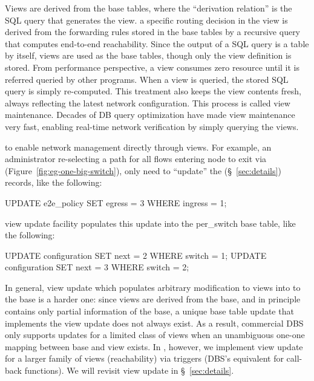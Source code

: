  Views are derived from the base
tables, where the ``derivation relation'' is the SQL query that
generates the view. \Eg a specific routing decision in the
 view is derived from the forwarding rules
stored in the base tables by a recursive query that computes
end-to-end reachability. Since the output of a SQL query is a table by
itself, views are used as the base tables, though only the view
definition is stored.  From performance perspective, a view consumes
zero resource until it is referred \ie queried by other programs. When
a view is queried, the stored SQL query is simply re-computed. This
treatment also keeps the view contents fresh, always reflecting the
latest network configuration. This process is called view
maintenance. Decades of DB query optimization have made view
maintenance very fast, enabling real-time network verification by
simply querying the views.

 to enable network management directly
through views. For example, an administrator re-selecting a path for
all flows entering node  to exit via 
(Figure~\ref{fig:eg-one-big-switch}), only need to ``update'' the
 (\S~\ref{sec:details}) records, like the
following:
\begin{sql}
UPDATE e2e_policy SET egress = 3 WHERE ingress = 1;
\end{sql}
\Sys view update facility populates this update into the per\_switch  base table, like the following:
\begin{sql}
UPDATE configuration SET next = 2 WHERE switch = 1;
UPDATE configuration SET next = 3 WHERE switch = 2;
\end{sql}
In general, view update which populates arbitrary modification to
views into to the base is a harder one: since views are derived from
the base, and in principle contains only partial information of the
base, a unique base table update that implements the view update does
not always exist. As a result, commercial DBS only supports updates
for a limited class of views when an unambiguous one-one mapping
between base and view exists.  In \Sys, however, we implement view
update for a larger family of views (\eg reachability) via triggers
(DBS's equivalent for call-back functions). We will revisit view
update in \S~\ref{sec:details}.



